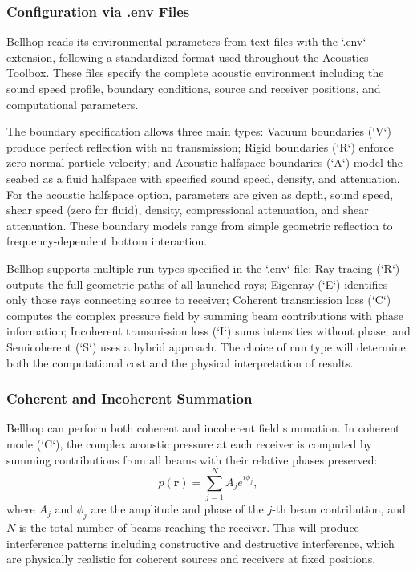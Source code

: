 \documentclass[fleqn]{jaes}
\begin{document}
\subsubsection{Configuration via .env Files}
Bellhop reads its environmental parameters from text files with the `.env` extension, following a standardized format used throughout the Acoustics Toolbox. These files specify the complete acoustic environment including the sound speed profile, boundary conditions, source and receiver positions, and computational parameters.

The boundary specification allows three main types: Vacuum boundaries (`V`) produce perfect reflection with no transmission; Rigid boundaries (`R`) enforce zero normal particle velocity; and Acoustic halfspace boundaries (`A`) model the seabed as a fluid halfspace with specified sound speed, density, and attenuation. For the acoustic halfspace option, parameters are given as depth, sound speed, shear speed (zero for fluid), density, compressional attenuation, and shear attenuation. These boundary models range from simple geometric reflection to frequency-dependent bottom interaction.

Bellhop supports multiple run types specified in the `.env` file: Ray tracing (`R`) outputs the full geometric paths of all launched rays; Eigenray (`E`) identifies only those rays connecting source to receiver; Coherent transmission loss (`C`) computes the complex pressure field by summing beam contributions with phase information; Incoherent transmission loss (`I`) sums intensities without phase; and Semicoherent (`S`) uses a hybrid approach. The choice of run type will determine both the computational cost and the physical interpretation of results.

\subsubsection{Coherent and Incoherent Summation}
Bellhop can perform both coherent and incoherent field summation. In coherent mode (`C`), the complex acoustic pressure at each receiver is computed by summing contributions from all beams with their relative phases preserved:
\begin{equation}
p(\mathbf{r}) = \sum_{j=1}^{N} A_j e^{i\phi_j},
\end{equation}
where $A_j$ and $\phi_j$ are the amplitude and phase of the $j$-th beam contribution, and $N$ is the total number of beams reaching the receiver. This will produce interference patterns including constructive and destructive interference, which are physically realistic for coherent sources and receivers at fixed positions.
\end{document}
